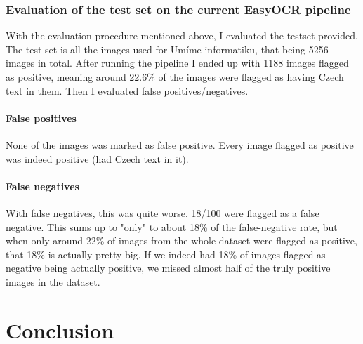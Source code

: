 \documentclass[
  digital,     %
  oneside,     %
  nosansbold,  %
  nocolorbold, %
  nolof,         %
  nolot,         %
]{fithesis4}
\begin{document}
\subsection{Evaluation of the test set on the current EasyOCR pipeline}

With the evaluation procedure mentioned above, I evaluated the testset provided. The test set is all the images used for Umíme informatiku, that being 5256 images in total. After running the pipeline I ended up with 1188 images flagged as positive, meaning around 22.6\% of the images were flagged as having Czech text in them.
Then I evaluated false positives/negatives.

\subsubsection{False positives}
None of the images was marked as false positive. Every image flagged as positive was indeed positive (had Czech text in it).

\subsubsection{False negatives}
With false negatives, this was quite worse. 18/100 were flagged as a false negative. This sums up to "only" to about 18\% of the false-negative rate, but when only around 22\% of images from the whole dataset were flagged as positive, that 18\% is actually pretty big. If we indeed had 18\% of images flagged as negative being actually positive, we missed almost half of the truly positive images in the dataset.

\chapter{Conclusion}
\end{document}
